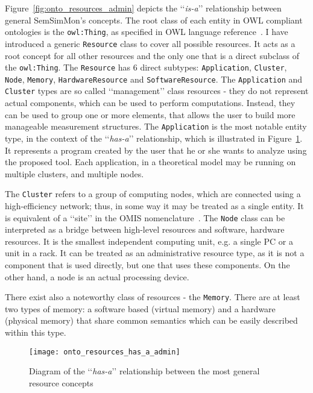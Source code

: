 Figure~\ref{fig:onto_resources_admin} depicts the \lq\lq{}\emph{is-a}\rq\rq{} relationship between general SemSimMon\rq{}s concepts. The root class of each entity in OWL compliant ontologies is the \texttt{owl:Thing}, as specified in OWL language reference~\cite{owlRef:2009}. I have introduced a generic \texttt{Resource} class to cover all possible resources. It acts as a root concept for all other resources and the only one that is a direct subclass of the \texttt{owl:Thing}. The \texttt{Resource} has 6 direct subtypes: \texttt{Application}, \texttt{Cluster}, \texttt{Node}, \texttt{Memory}, \texttt{HardwareResource} and \texttt{SoftwareResource}. The \texttt{Application} and \texttt{Cluster} types are so called \lq\lq{}management\rq\rq{} class resources - they do not represent actual components, which can be used to perform computations. Instead, they can be used to group one or more elements, that allows the user to build more manageable measurement structures. The \texttt{Application} is the most notable entity type, in the context of the \lq\lq{}\emph{has-a}\rq\rq{} relationship, which is illustrated in Figure~\ref{fig:onto_resources_has_a_admin}. It represents a program created by the user that he or she wants to analyze using the proposed tool. Each application, in a theoretical model may be running on multiple clusters, and multiple nodes.

The \texttt{Cluster} refers to a group of computing nodes, which are connected using a high-efficiency network; thus, in some way it may be treated as a single entity. It is equivalent of a \lq\lq{}site\rq\rq{} in the OMIS nomenclature~\cite{tl9702e}. The \texttt{Node} class can be interpreted as a bridge between high-level resources and software, hardware resources. It is the smallest independent computing unit, e.g. a single PC or a unit in a rack. It can be treated as an administrative resource type, as it is not a component that is used directly, but one that uses these components. On the other hand, a node is an actual processing device.

There exist also a noteworthy class of resources - the \texttt{Memory}. There are at least two types of memory: a software based (virtual memory) and a hardware (physical memory) that share common semantics which can be easily described within this type.

\begin{figure}[ht]
\centering
\texttt{[image: onto\_resources\_has\_a\_admin]}
\caption{Diagram of the \lq\lq{}\emph{has-a}\rq\rq{} relationship between the most general resource concepts}
\label{fig:onto_resources_has_a_admin}
\end{figure}

